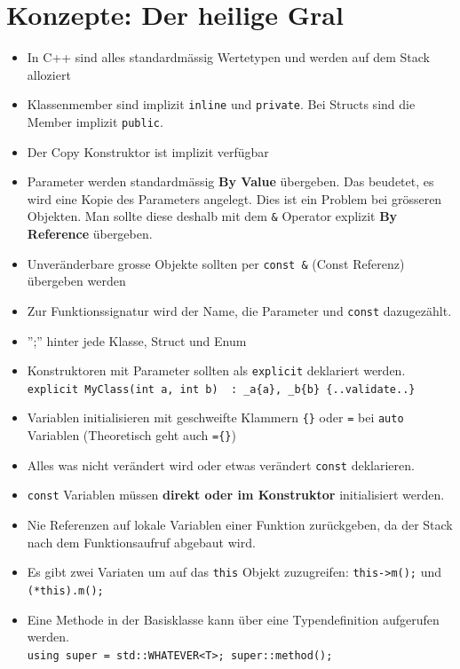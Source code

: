 \section{Konzepte: Der heilige Gral}
\begin{itemize}
	\item In C++ sind alles standardmässig Wertetypen und werden auf dem Stack alloziert
	\item Klassenmember sind implizit \lstinline|inline| und \lstinline|private|. Bei Structs sind die Member implizit \lstinline|public|.
	\item Der Copy Konstruktor ist implizit verfügbar
	\item Parameter werden standardmässig \textbf{By Value} übergeben. Das beudetet, es wird eine Kopie des Parameters angelegt. Dies ist ein Problem bei grösseren Objekten. Man sollte diese deshalb mit dem \lstinline|&| Operator explizit \textbf{By Reference} übergeben.
	\item Unveränderbare grosse Objekte sollten per \lstinline|const &| (Const Referenz) übergeben werden
	\item Zur Funktionssignatur wird der Name, die Parameter und \lstinline|const| dazugezählt.
	\item '';'' hinter jede Klasse, Struct und Enum
	\item Konstruktoren mit Parameter sollten als \lstinline |explicit| deklariert werden. \\
	\lstinline|explicit MyClass(int a, int b)  : _a{a}, _b{b} {..validate..}|
	\item Variablen initialisieren mit geschweifte Klammern \lstinline|{}| oder \lstinline|=| bei \lstinline|auto| Variablen (Theoretisch geht auch \lstinline|={}|)
	\item Alles was nicht verändert wird oder etwas verändert \lstinline|const| deklarieren.
	\item \lstinline|const| Variablen müssen \textbf{direkt oder im Konstruktor} initialisiert werden.
	\item Nie Referenzen auf lokale Variablen einer Funktion zurückgeben, da der Stack nach dem Funktionsaufruf abgebaut wird.
	\item Es gibt zwei Variaten um auf das \lstinline|this| Objekt zuzugreifen: \lstinline|this->m();| und \lstinline|(*this).m();|
	\item Eine Methode in der Basisklasse kann über eine Typendefinition aufgerufen werden. \\
	\lstinline|using super = std::WHATEVER<T>; super::method();|

\end{itemize}
